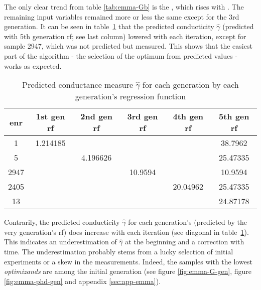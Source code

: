 The only clear trend from table \ref{tab:emma-Gb} is the , which rises with . 
The remaining input variables remained more or less the same except for the 3rd generation. 
%
It can be seen in table~\ref{tab:emma-pred-G} 
that the predicted conducticity $\hat{\gamma}$ 
(predicted with 5th generation \gls{rf}; see last column) lowered with each iteration, 
except for sample 2947, which was not predicted but measured. 
This shows that the easiest part of the algorithm - the selection of the optimum 
from predicted values - works as expected. 
\begin{table}
	\centering
    \caption{Predicted conductance measure $\hat{\gamma}$ for each generation by each generation's regression function}  
    \label{tab:emma-pred-G}
    \begin{tabular}{cccccc}
        \hline\hline
    enr &1st gen \gls{rf}   &2nd gen \gls{rf} &3rd gen \gls{rf}    &4th gen \gls{rf}   &5th gen \gls{rf}\\
        \hline
    1       &1.214185    &       &       &       &38.7962       \\
    5       &       &4.196626       &       &       &25.47335       \\
    2947    &       &       &10.9594    &       &10.9594       \\
    2405    &       &       &       &20.04962   &25.47335       \\
    13      &       &       &       &       &24.87178   \\
        \hline\hline
    \end{tabular}
\end{table}
%
Contrarily, the predicted conducticity $\hat{\gamma}$ for each generation's 
(predicted by the very generation's \gls{rf}) does increase with each iteration 
(see diagonal in table~\ref{tab:emma-pred-G}). 
This indicates an underestimation of $\hat\gamma$ at the beginning and a correction with time. 
The underestimation probably stems from a lucky selection of initial experiments or a skew in the measurements. 
\linebreak[4]
Indeed, the samples with the lowest \textit{optimizands} are among the initial generation (see figure \ref{fig:emma-G-gen}, figure \ref{fig:emma-phd-gen} and appendix \ref{sec:app-emma}).


